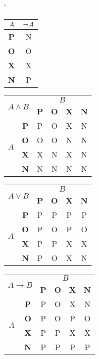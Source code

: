 \documentclass[a4paper, 11pt]{article}
\begin{document}
\bigskip
\begin{table}[h!]
\catcode`
\centering
\begin{tabular}{|c|c|}
\hline
$A$ & $\neg A$ \\ \hline
\textbf{P} & N\\ \cline{1-2}
\textbf{O} & O\\ \cline{1-2}
\textbf{X} & X\\ \cline{1-2}
\textbf{N} & P\\ \hline
\end{tabular}
\begin{tabular}{|c|c|c|c|c|c|}
\hline
\multicolumn{2}{|c|}{\multirow{2}{*}{$A \wedge B$}} & \multicolumn{4}{c|}{$B$}                                            \\\cline{3-6}
\multicolumn{2}{|c|}{ } & \textbf{P} & \textbf{O} & \textbf{X} & \textbf{N} \\ \hline
\multirow{4}{*}{$A$}
 & \textbf{P} & P & O & X & N\\ \cline{2-6}
 & \textbf{O} & O & O & N & N\\ \cline{2-6}
 & \textbf{X} & X & N & X & N\\ \cline{2-6}
 & \textbf{N} & N & N & N & N\\ \cline{2-6}
\hline
\end{tabular}
\begin{tabular}{|c|c|c|c|c|c|}
\hline
\multicolumn{2}{|c|}{\multirow{2}{*}{$A \vee B$}} & \multicolumn{4}{c|}{$B$}                                             \\\cline{3-6}
\multicolumn{2}{|c|}{ } & \textbf{P} & \textbf{O} & \textbf{X} & \textbf{N} \\ \hline
\multirow{4}{*}{$A$}
 & \textbf{P} & P & P & P & P\\ \cline{2-6}
 & \textbf{O} & P & O & P & O\\ \cline{2-6}
 & \textbf{X} & P & P & X & X\\ \cline{2-6}
 & \textbf{N} & P & O & X & N\\ \cline{2-6}
\hline
\end{tabular}
\begin{tabular}{|c|c|c|c|c|c|}
\hline
\multicolumn{2}{|c|}{\multirow{2}{*}{$A \rightarrow B$}} & \multicolumn{4}{c|}{$B$}                                             \\\cline{3-6}
\multicolumn{2}{|c|}{ } & \textbf{P} & \textbf{O} & \textbf{X} & \textbf{N} \\ \hline
\multirow{4}{*}{$A$}
 & \textbf{P} & P & O & X & N\\ \cline{2-6}
 & \textbf{O} & P & O & P & O\\ \cline{2-6}
 & \textbf{X} & P & P & X & X\\ \cline{2-6}
 & \textbf{N} & P & P & P & P\\ \cline{2-6}
\hline
\end{tabular}


\end{table}
\end{document}
